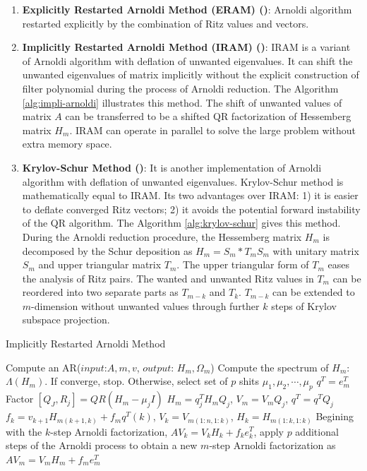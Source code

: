\begin{enumerate}
	\item \textbf{Explicitly Restarted Arnoldi Method (ERAM) (\cite{morgan1996restarting})}: Arnoldi algorithm restarted explicitly by the combination of Ritz values and vectors.
	
	\item \textbf{Implicitly Restarted Arnoldi Method (IRAM) (\cite{sorensen1997implicitly})}: IRAM is a variant of Arnoldi algorithm with deflation of unwanted eigenvalues. It can shift the unwanted eigenvalues of matrix implicitly without the explicit construction of filter polynomial during the process of Arnoldi reduction. The Algorithm \ref{alg:impli-arnoldi} illustrates this method. The shift of unwanted values of matrix $A$ can be transferred to be a shifted QR factorization of Hessemberg matrix $H_m$. IRAM can operate in parallel to solve the large problem without extra memory space.
	
	\item \textbf{Krylov-Schur Method (\cite{stewart2002krylov})}: It is another implementation of Arnoldi algorithm with deflation of unwanted eigenvalues. Krylov-Schur method is mathematically equal to IRAM. Its two advantages over IRAM: 1) it is easier to deflate converged Ritz vectors; 2) it avoids the potential forward instability of the QR algorithm. The Algorithm \ref{alg:krylov-schur} gives this method. During the Arnoldi reduction procedure, the Hessemberg matrix $H_m$ is decomposed by the Schur deposition as $H_m=S_m*T_mS_m$ with unitary matrix $S_m$ and upper triangular matrix $T_m$. The upper triangular form of $T_m$ eases the analysis of Ritz pairs. The wanted and unwanted Ritz values in $T_m$ can be reordered into two separate parts as $T_{m-k}$ and $T_k$. $T_{m-k}$ can be extended to $m$-dimension without unwanted values through further $k$ steps of Krylov subspace projection. 
	
\end{enumerate}

\begin{algorithm}[t]{}
	\caption{Implicitly Restarted Arnoldi Method}   
	\label{alg:impli-arnoldi}   
	\begin{algorithmic}[1]
		\State Compute an AR($input$:$A,m,v$, $output$: $H_m, \Omega_m$)
		\State Compute the spectrum of $H_m$: $\Lambda (H_m)$. If converge, stop. Otherwise, select set of $p$ shits $\mu_1, \mu_2,\cdots, \mu_p$
		\State $q^T = e_m^T$
		\State Factor $[Q_J, R_j] = QR(H_m-\mu_jI)$
		\State $H_m = q_j^TH_mQ_j$, $V_m=V_mQ_j$, $q^T=q^TQ_j$
		\EndFor 
		\State $f_k=v_{k+1}H_{m(k+1,k)}+f_mq^T(k)$, $V_k=V_{m(1:n,1:k)}$, $H_k=H_{m(1:k,1:k)}$
		\State Begining with the $k$-step Arnoldi factorization, $AV_k=V_kH_k+f_ke_k^T$, apply $p$ additional steps of the Arnoldi process to obtain a new $m$-step Arnoldi factorization as $AV_m=V_mH_m+f_me_m^T$
		\EndFunction
	\end{algorithmic}  
\end{algorithm}


